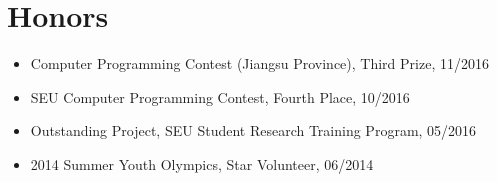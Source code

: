 \documentclass[letterpaper,11pt]{article}
\newcommand{\resumeSingleSubItem}[1]{
   \item\small{
    #1
  }
}
\begin{document}
\section{Honors}
    \begin{itemize}[leftmargin=*, itemsep=-2pt]
        \resumeSingleSubItem{Computer Programming Contest (Jiangsu Province), Third Prize, 11/2016}
        \resumeSingleSubItem{SEU Computer Programming Contest, Fourth Place, 10/2016}
        \resumeSingleSubItem{Outstanding Project, SEU Student Research Training Program, 05/2016}
        \resumeSingleSubItem{2014 Summer Youth Olympics, Star Volunteer, 06/2014}
    \end{itemize}\vspace{-15pt}

\end{document}
